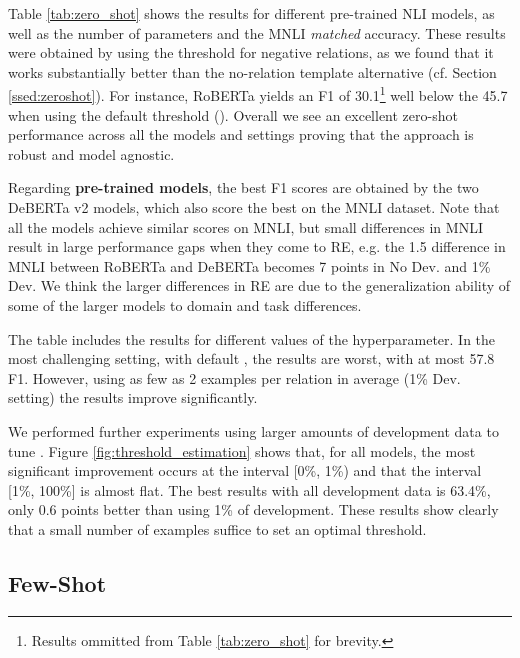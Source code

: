 \documentclass[11pt]{article}
\begin{document}
Table \ref{tab:zero_shot} shows the results for different pre-trained NLI models, as well as the number of parameters and the MNLI \textit{matched} accuracy. These results were obtained by using the threshold for negative relations, as we found that it works substantially better than the no-relation template alternative (cf. Section \ref{ssed:zeroshot}). For instance, RoBERTa yields an F1 of 30.1\footnote{Results ommitted from Table \ref{tab:zero_shot} for brevity.} well below the 45.7 when using the default threshold (). Overall we see an excellent zero-shot performance across all the models and settings proving that the approach is robust and model agnostic. 



Regarding \textbf{pre-trained models}, the best F1 scores are obtained by the two DeBERTa v2 models, which also score the best on the MNLI dataset. Note that all the models achieve similar scores on MNLI, but small differences in MNLI  result in large performance gaps when they come to RE, e.g. the 1.5 difference in MNLI between RoBERTa and DeBERTa becomes 7 points in No Dev. and 1\% Dev. We think the larger differences in RE are due to the generalization ability of some of the larger models to domain and task differences.

The table includes the results for different values of the  hyperparameter. In the most challenging setting, with default , the results are worst, with at most 57.8 F1. However, using as few as 2 examples per relation in average (1\% Dev. setting) the results improve significantly.

We  performed further experiments using larger amounts of development data to tune . Figure \ref{fig:threshold_estimation} shows that, for all models, the most significant improvement occurs at the interval [0\%, 1\%) and that the interval [1\%, 100\%] is almost flat. The best results with all development data is 63.4\%, only 0.6 points better than using 1\% of development. These results show clearly that a small number of examples suffice to set an optimal threshold. 





\subsection{Few-Shot}
\end{document}
